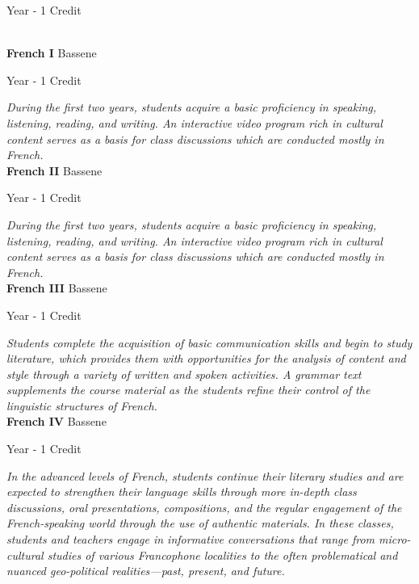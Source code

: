 \noindent Year - 1 Credit

\vspace{5mm}\\

\noindent\textbf{French I} \hfill Bassene

\noindent Year - 1 Credit

\vspace{1mm}\emph{During the first two years, students acquire a basic proficiency in speaking, listening, reading, and writing.  An interactive video program rich in cultural content serves as a basis for class discussions which are conducted mostly in French.}\\

\noindent\textbf{French II} \hfill Bassene

\noindent Year - 1 Credit

\vspace{1mm}\emph{During the first two years, students acquire a basic proficiency in speaking, listening, reading, and writing.  An interactive video program rich in cultural content serves as a basis for class discussions which are conducted mostly in French.}\\

\noindent\textbf{French III} \hfill Bassene

\noindent Year - 1 Credit

\vspace{1mm}\emph{Students complete the acquisition of basic communication skills and begin to study literature, which provides them with opportunities for the analysis of content and style through a variety of written and spoken activities.  A grammar text supplements the course material as the students refine their control of the linguistic structures of French.}\\

\noindent\textbf{French IV} \hfill Bassene

\noindent Year - 1 Credit

\vspace{1mm}\emph{In the advanced levels of French, students continue their literary studies and are expected to strengthen their language skills through more in-depth class discussions, oral presentations, compositions, and the regular engagement of the French-speaking world through the use of authentic materials.  In these classes, students and teachers engage in informative conversations that range from micro-cultural studies of various Francophone localities to the often problematical and nuanced geo-political realities—past, present, and future.}\\

